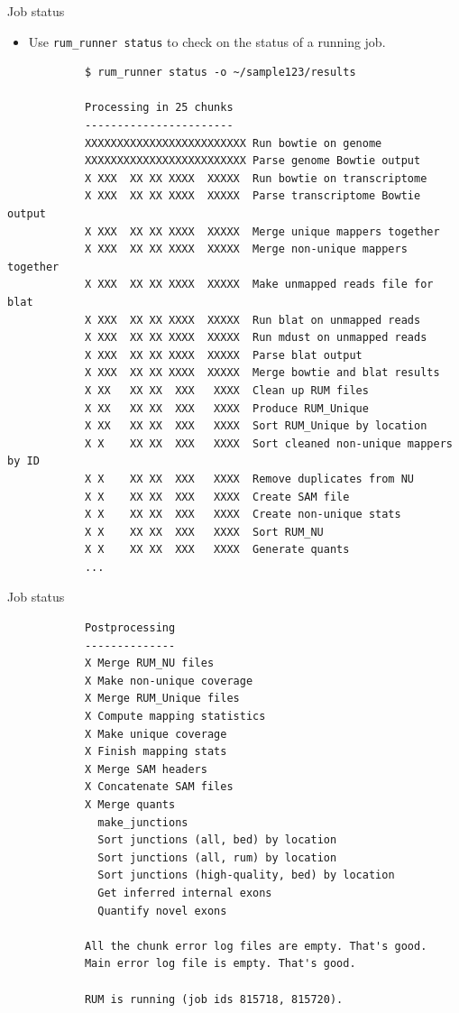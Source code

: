 \documentclass{beamer}
\begin{document}
\begin{frame}[fragile]{Job status}
  \begin{itemize}
  \item Use \texttt{rum\_runner status} to check on the status of a
    running job.
  \end{itemize}
  \tiny
\begin{verbatim}
            $ rum_runner status -o ~/sample123/results
            
            Processing in 25 chunks
            -----------------------
            XXXXXXXXXXXXXXXXXXXXXXXXX Run bowtie on genome
            XXXXXXXXXXXXXXXXXXXXXXXXX Parse genome Bowtie output
            X XXX  XX XX XXXX  XXXXX  Run bowtie on transcriptome
            X XXX  XX XX XXXX  XXXXX  Parse transcriptome Bowtie output
            X XXX  XX XX XXXX  XXXXX  Merge unique mappers together
            X XXX  XX XX XXXX  XXXXX  Merge non-unique mappers together
            X XXX  XX XX XXXX  XXXXX  Make unmapped reads file for blat
            X XXX  XX XX XXXX  XXXXX  Run blat on unmapped reads
            X XXX  XX XX XXXX  XXXXX  Run mdust on unmapped reads
            X XXX  XX XX XXXX  XXXXX  Parse blat output
            X XXX  XX XX XXXX  XXXXX  Merge bowtie and blat results
            X XX   XX XX  XXX   XXXX  Clean up RUM files
            X XX   XX XX  XXX   XXXX  Produce RUM_Unique
            X XX   XX XX  XXX   XXXX  Sort RUM_Unique by location
            X X    XX XX  XXX   XXXX  Sort cleaned non-unique mappers by ID
            X X    XX XX  XXX   XXXX  Remove duplicates from NU
            X X    XX XX  XXX   XXXX  Create SAM file
            X X    XX XX  XXX   XXXX  Create non-unique stats
            X X    XX XX  XXX   XXXX  Sort RUM_NU
            X X    XX XX  XXX   XXXX  Generate quants
            ...
\end{verbatim}
\end{frame}

\begin{frame}[fragile]{Job status}
\tiny
\begin{verbatim}
            Postprocessing
            --------------
            X Merge RUM_NU files
            X Make non-unique coverage
            X Merge RUM_Unique files
            X Compute mapping statistics
            X Make unique coverage
            X Finish mapping stats
            X Merge SAM headers
            X Concatenate SAM files
            X Merge quants
              make_junctions
              Sort junctions (all, bed) by location
              Sort junctions (all, rum) by location
              Sort junctions (high-quality, bed) by location
              Get inferred internal exons
              Quantify novel exons
            
            All the chunk error log files are empty. That's good.
            Main error log file is empty. That's good.
            
            RUM is running (job ids 815718, 815720).
\end{verbatim}
\end{frame}
\end{document}
